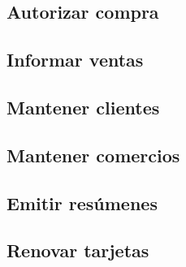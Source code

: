 \subsection{Autorizar compra}


\subsection{Informar ventas}


\subsection{Mantener clientes}


\subsection{Mantener comercios}


\subsection{Emitir resúmenes}


\subsection{Renovar tarjetas}


